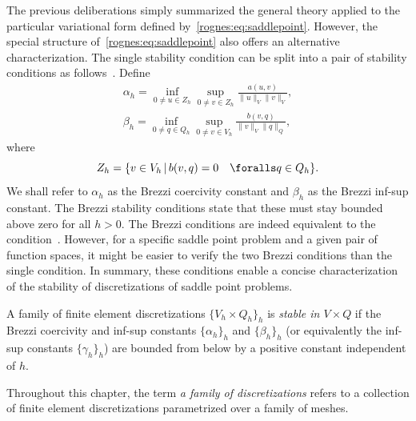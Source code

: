 
The previous deliberations simply summarized the general theory
applied to the particular variational form defined
by~\eqref{rognes:eq:saddlepoint}. However, the special structure
of~\eqref{rognes:eq:saddlepoint} also offers an alternative
characterization. The single \babuska{} stability condition can be
split into a pair of stability conditions as
follows~\citep{Brezzi1974}. Define
\begin{align}
  \label{rognes:eq:brezzi:coercivity}
  \alpha_h =
  \inf_{0 \not = u \in Z_h}
  \sup_{0 \not = v \in Z_h}
  \frac{a(u, v)}{\|u\|_{V} \|v\|_{V}} , \\
  \label{rognes:eq:brezzi:infsup}
  \beta_h =
  \inf_{0 \not = q \in Q_h}
  \sup_{0 \not = v \in V_h}
  \frac{b(v, q)}
       {\|v\|_{V} \|q\|_{Q}},
\end{align}
where
\begin{equation}
  Z_h = \{ v \in V_h \, | \, b(v, q) = 0 \quad \foralls q \in Q_h\}.
\end{equation}
We shall refer to $\alpha_h$ as the Brezzi coercivity constant and
$\beta_h$ as the Brezzi inf-sup constant. The Brezzi stability
conditions state that these must stay bounded above zero for all $h >
0$. The Brezzi conditions are indeed equivalent to the \babuska{}
condition~\citep{Brezzi1974}. However, for a specific saddle point
problem and a given pair of function spaces, it might be easier to
verify the two Brezzi conditions than the single \babuska{} condition.
In summary, these conditions enable a concise characterization of the
stability of discretizations of saddle point problems.
\begin{definition}
  \label{rognes:def:stable}
  A family of finite element discretizations $\{V_h \times Q_h\}_h$
  is \emph{stable in $V \times Q$} if the Brezzi coercivity and
  inf-sup constants $\{ \alpha_h \}_h $ and $\{ \beta_h \}_h$ (or
  equivalently the \babuska{} inf-sup constants $\{ \gamma_h \}_h$)
  are bounded from below by a positive constant independent of $h$.
\end{definition}
Throughout this chapter, the term \emph{a family of discretizations}
refers to a collection of finite element discretizations parametrized
over a family of meshes.

